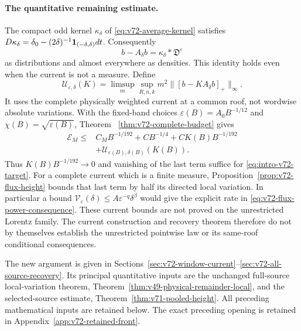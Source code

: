 \paragraph{The quantitative remaining estimate.}
The compact odd kernel $\kappa_\delta$ of
\eqref{eq:v72-average-kernel} satisfies
$D\kappa_\delta=\delta_0-(2\delta)^{-1}\mathbf1_{(-\delta,\delta)}dt$.
Consequently
\[
 b-A_\delta b=\kappa_\delta*\mathfrak D^\varepsilon
\]
as distributions and almost everywhere as densities. This identity
holds even when the current is not a measure. Define
\[
 \mathcal U_{\varepsilon,\delta}(K)
 =\limsup_m\sup_{R,n,k}m^2\|[b-KA_\delta b]_+\|_\infty.
\]
It uses the complete physically weighted current at a common roof,
not wordwise absolute variations. With the fixed-band choices
$\varepsilon(B)=A_0B^{-1/12}$ and
$\chi(B)=\sqrt{\varepsilon(B)}$, Theorem~
\ref{thm:v72-complete-budget} gives
\begin{equation}\label{eq:intro-v72-budget}
 \begin{split}
 \mathcal E_M\le{}&C_MB^{-1/192}+CB^{-1/4}
             +CK(B)B^{-1/192}\\
             &+\mathcal U_{\varepsilon(B),\delta(B)}(K(B)).
 \end{split}
\end{equation}
Thus $K(B)B^{-1/192}\to0$ and vanishing of the last term suffice
for \eqref{eq:intro-v72-target}. For a complete current which is a
finite measure, Proposition~\ref{prop:v72-flux-height} bounds that
last term by half its directed local variation. In particular a
bound $\mathcal V_\varepsilon(\delta)\le A\varepsilon^{-q}\delta^\beta$
would give the explicit rate in \eqref{eq:v72-flux-power-consequence}.
These current bounds are not proved on the unrestricted Lorentz
family. The current construction and recovery theorem therefore do
not by themselves establish the unrestricted pointwise law or its
same-roof conditional consequences.

The new argument is given in
Sections~\ref{sec:v72-window-current}--\ref{sec:v72-all-source-recovery}.
Its principal quantitative inputs are the unchanged full-source
local-variation theorem, Theorem~\ref{thm:v49-physical-remainder-local},
and the selected-source estimate, Theorem~\ref{thm:v71-pooled-height}.
All preceding mathematical inputs are retained below. The exact
preceding opening is retained in Appendix~\ref{app:v72-retained-front}.

